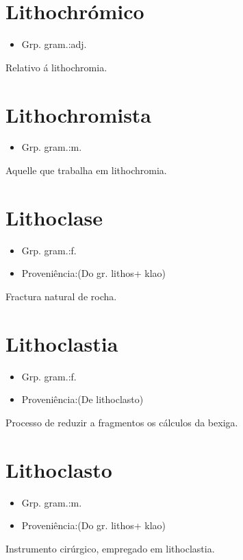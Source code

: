 \section{Lithochrómico}
\begin{itemize}
\item {Grp. gram.:adj.}
\end{itemize}
Relativo á lithochromia.
\section{Lithochromista}
\begin{itemize}
\item {Grp. gram.:m.}
\end{itemize}
Aquelle que trabalha em lithochromia.
\section{Lithoclase}
\begin{itemize}
\item {Grp. gram.:f.}
\end{itemize}
\begin{itemize}
\item {Proveniência:(Do gr. \textunderscore lithos\textunderscore  + \textunderscore klao\textunderscore )}
\end{itemize}
Fractura natural de rocha.
\section{Lithoclastia}
\begin{itemize}
\item {Grp. gram.:f.}
\end{itemize}
\begin{itemize}
\item {Proveniência:(De \textunderscore lithoclasto\textunderscore )}
\end{itemize}
Processo de reduzir a fragmentos os cálculos da bexiga.
\section{Lithoclasto}
\begin{itemize}
\item {Grp. gram.:m.}
\end{itemize}
\begin{itemize}
\item {Proveniência:(Do gr. \textunderscore lithos\textunderscore  + \textunderscore klao\textunderscore )}
\end{itemize}
Instrumento cirúrgico, empregado em lithoclastia.
